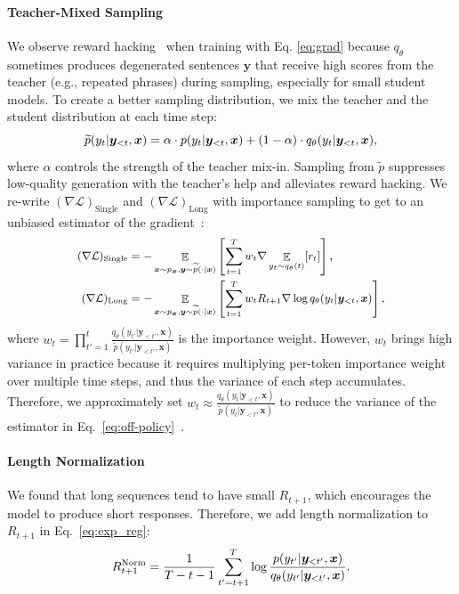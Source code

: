 \documentclass{article}
\def\expct{\mathop{\mathbb{E}}}
\def\pst{q_{\theta}(y_t | \by_{<t}, \bx)}
\def\pstp{q_{\theta}(y_{t'} | \by_{<t'}, \bx)}
\def\ptt{p(y_t | \by_{<t}, \bx)}
\def\pttp{p(y_{t'} | \by_{<t'}, \bx)}
\def\pmt{\widetilde{p}(y_t | \by_{<t}, \bx)}
\def\bx{\bm{x}}
\def\by{\bm{y}}
\begin{document}
\paragraph{Teacher-Mixed Sampling}
We observe reward hacking~\citep{reward_hacking} when training with Eq. \ref{eq:grad} because $q_\theta$ sometimes produces degenerated sentences $\by$ that receive high scores from the teacher (e.g., repeated phrases) during sampling, especially for small student models. To create a better sampling distribution, we mix the teacher and the student distribution at each time step:
\begin{equation}
\small
\label{eq:teacher_mix}
 \pmt  = \alpha \cdot \ptt + (1-\alpha) \cdot \pst,
\end{equation}
where $\alpha$ controls the strength of the teacher mix-in. Sampling from $\widetilde{p}$ suppresses low-quality generation with the teacher's help and alleviates reward hacking. We re-write $(\nabla \mathcal{L})_{\text{Single}}$ and $(\nabla \mathcal{L})_{\text{Long}}$ with importance sampling to get to an unbiased estimator of the gradient~\citep{off_policy}:
\begin{equation}
    \small
    \label{eq:off-policy}
    \begin{aligned}
        (\nabla \mathcal{L})_{\text{Single}} &= -\expct_{\bx \sim p_{\bx}, \by \sim \widetilde{p}(\cdot | \bx)} \left[ \sum_{t=1}^T w_t \nabla \expct_{y_t \sim q_\theta (t)}[r_t]\right], \\
        (\nabla \mathcal{L})_{\text{Long}} &= -\expct_{\bx \sim p_{\bx}, \by \sim \widetilde{p}(\cdot | \bx)} \left[\sum_{t=1}^T w_tR_{t+1} \nabla \log \pst\right],
    \end{aligned}
\end{equation}
where $w_t=\prod_{t'=1}^{t} \frac{q_\theta(y_{t'}|\by_{<t'}, \bx)}{\widetilde{p}(y_{t'} | \by_{<t'}, \bx)}$ is the importance weight. However, $w_t$ brings high variance in practice because it requires multiplying per-token importance weight over multiple time steps, and thus the variance of each step accumulates. Therefore, we approximately set $w_t \approx \frac{\pst}{\widetilde{p}(y_{t} | \by_{<t}, \bx)}$ to reduce the variance of the estimator in Eq.~\ref{eq:off-policy}~\citep{deep_rl_chat,offline_rl}.

\vspace{-2pt}

\paragraph{Length Normalization}
We found that long sequences tend to have small $R_{t+1}$, which encourages the model to produce short responses. Therefore, we add length normalization to $R_{t+1}$ in Eq.~\ref{eq:exp_reg}: 
\begin{equation}
\small
\label{eq:q_norm}
R^{\text{Norm}}_{t+1} = \frac{1}{T-t-1}\sum_{t'=t+1}^T \log \frac{\pttp}{\pstp}. 
\end{equation}
\end{document}
